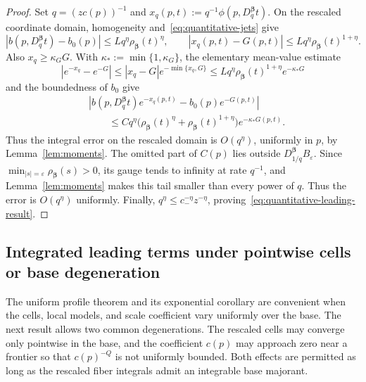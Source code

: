 \documentclass[11pt]{amsart}
\numberwithin{equation}{section}
\theoremstyle{definition}
\theoremstyle{remark}
\newcommand{\eps}{\varepsilon}
\begin{document}
\begin{proof}
Set $q=(zc(p))^{-1}$ and
$x_q(p,t):=q^{-1}\phi(p,D_q^{\bm\beta}t)$.  On the rescaled coordinate
domain, homogeneity and~\eqref{eq:quantitative-jets} give
\[
 |b(p,D_q^{\bm\beta}t)-b_0(p)|
 \le Lq^\eta\rho_{\bm\beta}(t)^\eta,
 \qquad
 |x_q(p,t)-G(p,t)|
 \le Lq^\eta\rho_{\bm\beta}(t)^{1+\eta}.
\]
Also $x_q\ge\kappa_G G$.  With $\kappa_*:=\min\{1,\kappa_G\}$, the elementary
mean-value estimate
\[
 |e^{-x_q}-e^{-G}|
 \le |x_q-G|e^{-\min\{x_q,G\}}
 \le Lq^\eta\rho_{\bm\beta}(t)^{1+\eta}e^{-\kappa_* G}
\]
and the boundedness of $b_0$ give
\begin{align*}
 &\left|b(p,D_q^{\bm\beta}t)e^{-x_q(p,t)}
       -b_0(p)e^{-G(p,t)}\right|\\
 &\qquad\le Cq^\eta
 \bigl(\rho_{\bm\beta}(t)^\eta
       +\rho_{\bm\beta}(t)^{1+\eta}\bigr)
 e^{-\kappa_* G(p,t)}.
\end{align*}
Thus the integral error on the rescaled domain is $O(q^\eta)$, uniformly in
$p$, by Lemma~\ref{lem:moments}.  The omitted part of $C(p)$ lies outside
$D_{1/q}^{\bm\beta}B_\eps$.  Since
$\min_{|s|=\eps}\rho_{\bm\beta}(s)>0$, its gauge tends to infinity at rate
$q^{-1}$, and Lemma~\ref{lem:moments} makes this tail smaller than every power
of $q$.  Thus the error is $O(q^\eta)$ uniformly.  Finally,
$q^\eta\le c_-^{-\eta}z^{-\eta}$, proving~\eqref{eq:quantitative-leading-result}.
\end{proof}

\subsection{Integrated leading terms under pointwise cells or base degeneration}

The uniform profile theorem and its exponential corollary are convenient when
the cells, local models, and scale coefficient vary uniformly over the base.  The next result allows two common
degenerations.  The rescaled cells may converge only pointwise in the base,
and the coefficient $c(p)$ may approach zero near a frontier so that
$c(p)^{-Q}$ is not uniformly bounded.  Both effects are permitted as long as
the rescaled fiber integrals admit an integrable base majorant.
\end{document}
